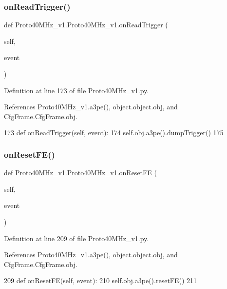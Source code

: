 \subsubsection{\texorpdfstring{on\+Read\+Trigger()}{onReadTrigger()}}
{\footnotesize\ttfamily def Proto40\+M\+Hz\+\_\+v1.\+Proto40\+M\+Hz\+\_\+v1.\+on\+Read\+Trigger (\begin{DoxyParamCaption}\item[{}]{self,  }\item[{}]{event }\end{DoxyParamCaption})}



Definition at line 173 of file Proto40\+M\+Hz\+\_\+v1.\+py.



References Proto40\+M\+Hz\+\_\+v1.\+a3pe(), object.\+object.\+obj, and Cfg\+Frame.\+Cfg\+Frame.\+obj.


\begin{DoxyCode}
173     \textcolor{keyword}{def }onReadTrigger(self, event):
174         self.obj.a3pe().dumpTrigger()
175 
\end{DoxyCode}
\mbox{\label{classProto40MHz__v1_1_1Proto40MHz__v1_a9b79ac2b7e3f3d0b3b11da1d0366656b}} 
\subsubsection{\texorpdfstring{on\+Reset\+F\+E()}{onResetFE()}}
{\footnotesize\ttfamily def Proto40\+M\+Hz\+\_\+v1.\+Proto40\+M\+Hz\+\_\+v1.\+on\+Reset\+FE (\begin{DoxyParamCaption}\item[{}]{self,  }\item[{}]{event }\end{DoxyParamCaption})}



Definition at line 209 of file Proto40\+M\+Hz\+\_\+v1.\+py.



References Proto40\+M\+Hz\+\_\+v1.\+a3pe(), object.\+object.\+obj, and Cfg\+Frame.\+Cfg\+Frame.\+obj.


\begin{DoxyCode}
209     \textcolor{keyword}{def }onResetFE(self, event):
210         self.obj.a3pe().resetFE()
211 
\end{DoxyCode}
\mbox{\label{classProto40MHz__v1_1_1Proto40MHz__v1_a64103f436e81b9e0b08d94b22fd4a088}} 
